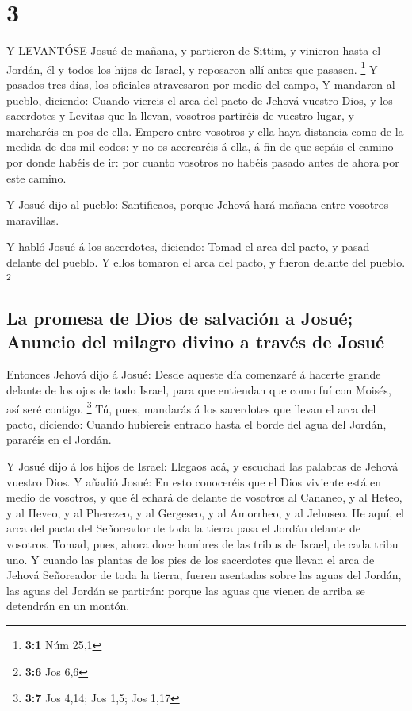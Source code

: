 \hypertarget{section-2}{%
\section{3}\label{section-2}}

 Y LEVANTÓSE Josué de mañana, y partieron de Sittim, y
vinieron hasta el Jordán, él y todos los hijos de Israel, y reposaron
allí antes que pasasen. \footnote{\textbf{3:1} Núm 25,1}  Y
pasados tres días, los oficiales atravesaron por medio del campo,
 Y mandaron al pueblo, diciendo: Cuando viereis el arca del
pacto de Jehová vuestro Dios, y los sacerdotes y Levitas que la llevan,
vosotros partiréis de vuestro lugar, y marcharéis en pos de ella.
 Empero entre vosotros y ella haya distancia como de la
medida de dos mil codos: y no os acercaréis á ella, á fin de que sepáis
el camino por donde habéis de ir: por cuanto vosotros no habéis pasado
antes de ahora por este camino.

 Y Josué dijo al pueblo: Santificaos, porque Jehová hará
mañana entre vosotros maravillas.

 Y habló Josué á los sacerdotes, diciendo: Tomad el arca del
pacto, y pasad delante del pueblo. Y ellos tomaron el arca del pacto, y
fueron delante del pueblo. \footnote{\textbf{3:6} Jos 6,6}

\hypertarget{la-promesa-de-dios-de-salvaciuxf3n-a-josuuxe9-anuncio-del-milagro-divino-a-travuxe9s-de-josuuxe9}{%
\subsection{La promesa de Dios de salvación a Josué; Anuncio del milagro
divino a través de
Josué}\label{la-promesa-de-dios-de-salvaciuxf3n-a-josuuxe9-anuncio-del-milagro-divino-a-travuxe9s-de-josuuxe9}}

 Entonces Jehová dijo á Josué: Desde aqueste día comenzaré á
hacerte grande delante de los ojos de todo Israel, para que entiendan
que como fuí con Moisés, así seré contigo. \footnote{\textbf{3:7} Jos
  4,14; Jos 1,5; Jos 1,17}  Tú, pues, mandarás á los
sacerdotes que llevan el arca del pacto, diciendo: Cuando hubiereis
entrado hasta el borde del agua del Jordán, pararéis en el Jordán.

 Y Josué dijo á los hijos de Israel: Llegaos acá, y escuchad
las palabras de Jehová vuestro Dios.  Y añadió Josué: En
esto conoceréis que el Dios viviente está en medio de vosotros, y que él
echará de delante de vosotros al Cananeo, y al Heteo, y al Heveo, y al
Pherezeo, y al Gergeseo, y al Amorrheo, y al Jebuseo.  He
aquí, el arca del pacto del Señoreador de toda la tierra pasa el Jordán
delante de vosotros.  Tomad, pues, ahora doce hombres de
las tribus de Israel, de cada tribu uno.  Y cuando las
plantas de los pies de los sacerdotes que llevan el arca de Jehová
Señoreador de toda la tierra, fueren asentadas sobre las aguas del
Jordán, las aguas del Jordán se partirán: porque las aguas que vienen de
arriba se detendrán en un montón.

